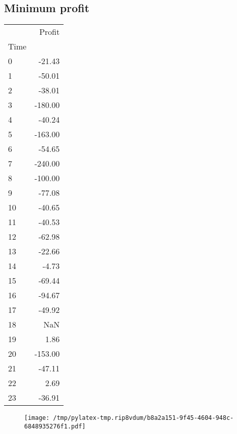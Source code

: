\documentclass{article}%
\begin{document}
\subsection{Minimum profit }%
\label{subsec:Minimumprofit}%
\begin{tabular}{lr}
\toprule
{} &  Profit \\
Time &         \\
\midrule
0    &  -21.43 \\
1    &  -50.01 \\
2    &  -38.01 \\
3    & -180.00 \\
4    &  -40.24 \\
5    & -163.00 \\
6    &  -54.65 \\
7    & -240.00 \\
8    & -100.00 \\
9    &  -77.08 \\
10   &  -40.65 \\
11   &  -40.53 \\
12   &  -62.98 \\
13   &  -22.66 \\
14   &   -4.73 \\
15   &  -69.44 \\
16   &  -94.67 \\
17   &  -49.92 \\
18   &     NaN \\
19   &    1.86 \\
20   & -153.00 \\
21   &  -47.11 \\
22   &    2.69 \\
23   &  -36.91 \\
\bottomrule
\end{tabular}
%


\begin{figure}[htbp]%
\centering%
\texttt{[image: /tmp/pylatex-tmp.rip8vdum/b8a2a151-9f45-4604-948c-6848935276f1.pdf]}%
\end{figure}

%
\newpage %
\end{document}
